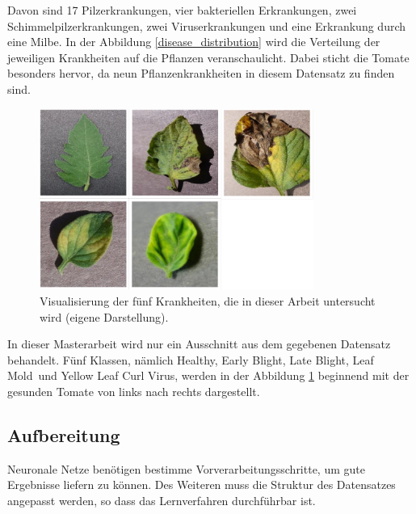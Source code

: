 Davon sind 17 Pilzerkrankungen, vier bakteriellen Erkrankungen, zwei Schimmelpilzerkrankungen, zwei Viruserkrankungen und eine Erkrankung durch eine Milbe. In der Abbildung \ref{disease_distribution} wird die Verteilung der jeweiligen Krankheiten auf die Pflanzen veranschaulicht. Dabei sticht die Tomate besonders hervor, da neun Pflanzenkrankheiten in diesem Datensatz zu finden sind.

\begin{figure}[h!]
	\centering
	\includegraphics[width=0.8\textwidth]{bilder/collage_5_classes}
	\caption{Visualisierung der fünf Krankheiten, die in dieser Arbeit untersucht wird (eigene Darstellung).}
	\label{collage_5_classes}
\end{figure}


In dieser Masterarbeit wird nur ein Ausschnitt aus dem gegebenen Datensatz behandelt. Fünf Klassen, nämlich \glqq Healthy\grqq, \glqq Early Blight\grqq, \glqq Late Blight\grqq, \glqq Leaf Mold\grqq~und \glqq Yellow Leaf Curl Virus\grqq, werden in der Abbildung \ref{collage_5_classes} beginnend mit der gesunden Tomate von links nach rechts dargestellt. 


\subsection{Aufbereitung}


Neuronale Netze benötigen bestimme Vorverarbeitungsschritte, um gute Ergebnisse liefern zu können. Des Weiteren muss die Struktur des Datensatzes angepasst werden, so dass das Lernverfahren durchführbar ist. 

